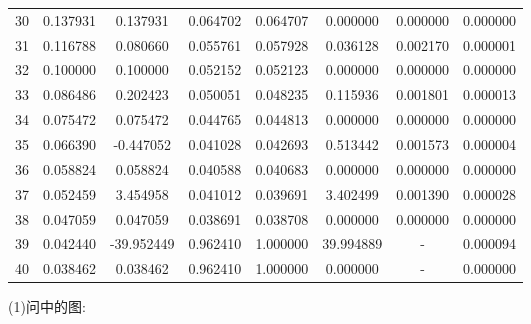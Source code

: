 \documentclass{article}
\numberwithin{equation}{section}
\numberwithin{table}{section}
\begin{document}
\begin{table}[H]
{\begin{tabular}{cccccccc}
            30      & 0.137931 & 0.137931   & 0.064702 & 0.064707 & 0.000000      & 0.000000     & 0.000000     \\
            31      & 0.116788 & 0.080660   & 0.055761 & 0.057928 & 0.036128      & 0.002170     & 0.000001     \\
            32      & 0.100000 & 0.100000   & 0.052152 & 0.052123 & 0.000000      & 0.000000     & 0.000000     \\
            33      & 0.086486 & 0.202423   & 0.050051 & 0.048235 & 0.115936      & 0.001801     & 0.000013     \\
            34      & 0.075472 & 0.075472   & 0.044765 & 0.044813 & 0.000000      & 0.000000     & 0.000000     \\
            35      & 0.066390 & -0.447052  & 0.041028 & 0.042693 & 0.513442      & 0.001573     & 0.000004     \\
            36      & 0.058824 & 0.058824   & 0.040588 & 0.040683 & 0.000000      & 0.000000     & 0.000000     \\
            37      & 0.052459 & 3.454958   & 0.041012 & 0.039691 & 3.402499      & 0.001390     & 0.000028     \\
            38      & 0.047059 & 0.047059   & 0.038691 & 0.038708 & 0.000000      & 0.000000     & 0.000000     \\
            39      & 0.042440 & -39.952449 & 0.962410 & 1.000000 & 39.994889     & -            & 0.000094     \\
            40      & 0.038462 & 0.038462   & 0.962410 & 1.000000 & 0.000000      & -            & 0.000000     \\
            \bottomrule
        \end{tabular}
    }
\end{table}
(1)问中的图:
\end{document}
